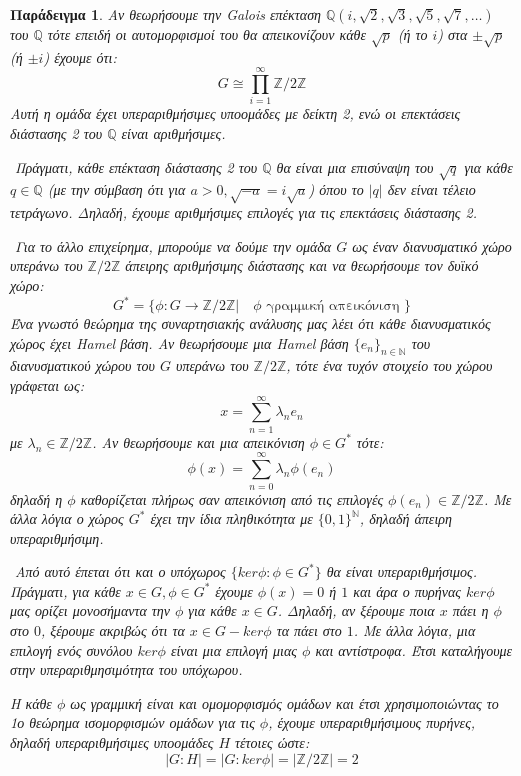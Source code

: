 \documentclass[oneside,a4paper]{article}
\newtheorem{example}{Παράδειγμα}
\newcommand {\tl}{\textlatin}
\newcommand{\Z}{\mathbb{Z}}
\newcommand{\Q}{\mathbb{Q}}
\begin{document}
\vspace{0.3truecm}
\begin{example}
	Αν θεωρήσουμε την \tl{Galois} επέκταση $\Q (i, \sqrt 2 , \sqrt 3 , \sqrt 5 , \sqrt 7 , \ldots)$ του $\Q$ τότε επειδή οι αυτομορφισμοί του θα απεικονίζουν κάθε $\sqrt p$ (ή το $i$) στα $ \pm \sqrt p$ (ή $\pm i$) έχουμε ότι:
	$$G \cong \prod\limits_{i=1}^{\infty} \Z / 2 \Z$$
	Αυτή η ομάδα έχει υπεραριθμήσιμες υποομάδες με δείκτη 2, ενώ οι επεκτάσεις διάστασης 2 του $\Q$ είναι αριθμήσιμες. 

	$ $\newline
	Πράγματι, κάθε επέκταση διάστασης 2 του $\Q$ θα είναι μια επισύναψη του $\sqrt{q}$ για κάθε $q\in \mathbb{Q}$ (με την σύμβαση ότι για $a>0, \sqrt{-a}=i\sqrt{a}$) όπου το $|q|$ δεν είναι τέλειο τετράγωνο. Δηλαδή, έχουμε αριθμήσιμες επιλογές για τις επεκτάσεις διάστασης 2.

	$ $\newline
	Για το άλλο επιχείρημα, μπορούμε να δούμε την ομάδα $G$ ως έναν διανυσματικό χώρο υπεράνω του $\mathbb Z / 2\mathbb Z$ άπειρης αριθμήσιμης διάστασης και να θεωρήσουμε τον δυϊκό χώρο:
	$$G^* = \{\phi: G\rightarrow \Z / 2\Z | \quad \phi \text{ γραμμική απεικόνιση }\}$$
	Ένα γνωστό θεώρημα της συναρτησιακής ανάλυσης μας λέει ότι κάθε διανυσματικός χώρος έχει \tl{Hamel} βάση. Αν θεωρήσουμε μια \tl{Hamel} βάση $\{e_n\}_{n \in \mathbb N}$ του διανυσματικού χώρου του $G$ υπεράνω του $\Z / 2 \Z$, τότε ένα τυχόν στοιχείο του χώρου γράφεται ως:
	$$x = \sum\limits_{n=1}^{\infty} \lambda_n e_n$$
	με $\lambda_n \in \Z / 2\Z$. Αν θεωρήσουμε και μια απεικόνιση $\phi \in G^*$ τότε:
	$$\phi (x) = \sum\limits_{n=0}^{\infty} \lambda_n \phi (e_n)$$
	δηλαδή η $\phi$ καθορίζεται πλήρως σαν απεικόνιση από τις επιλογές $\phi (e_n) \in \Z / 2 \Z$. Με άλλα λόγια ο χώρος $G^*$ έχει την ίδια πληθικότητα με $\{0,1\}^{\mathbb N}$, δηλαδή άπειρη υπεραριθμήσιμη.
	
	$ $\newline
	Από αυτό έπεται ότι και ο υπόχωρος $\{ ker\phi : \phi \in G^*\}$ θα είναι υπεραριθμήσιμος. Πράγματι, για κάθε $x \in G, \phi \in G^*$ έχουμε $\phi (x) = 0$ ή $1$ και άρα ο πυρήνας $ker\phi$ μας ορίζει μονοσήμαντα την $\phi$ για κάθε $x \in G$. Δηλαδή, αν ξέρουμε ποια $x$ πάει η $\phi$ στο $0$, ξέρουμε ακριβώς ότι τα $x \in G-ker\phi$ τα πάει στο $1$. Με άλλα λόγια, μια επιλογή ενός συνόλου $ker\phi$ είναι μια επιλογή μιας $\phi$ και αντίστροφα. Έτσι καταλήγουμε στην υπεραριθμησιμότητα του υπόχωρου.

	$ $\newline Η κάθε $\phi$ ως γραμμική είναι και ομομορφισμός ομάδων και έτσι χρησιμοποιώντας το 1ο θεώρημα ισομορφισμών ομάδων για τις $\phi$, έχουμε υπεραριθμήσιμους πυρήνες, δηλαδή υπεραριθμήσιμες υποομάδες $H$ τέτοιες ώστε:
	$$|G:H| = |G:ker\phi| = |\Z / 2\Z |  = 2$$

\end{example}
\end{document}
